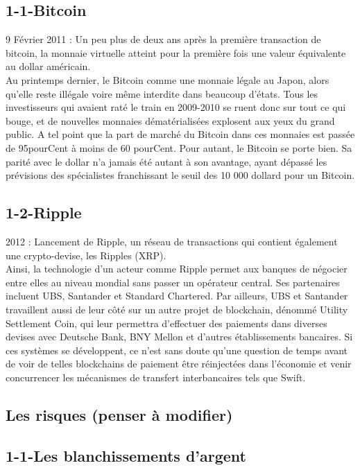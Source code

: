 \documentclass[12pt]{report}
\begin{document}
	    \subsection{1-1-Bitcoin}

9 Février 2011 : Un peu plus de deux ans après la première transaction de bitcoin, la monnaie virtuelle atteint pour la première fois une valeur équivalente au dollar américain.\\

Au printemps dernier, le Bitcoin comme une monnaie légale au Japon, alors qu’elle reste illégale voire même interdite dans beaucoup d’états. Tous les investisseurs qui avaient raté le train en 2009-2010 se ruent donc sur tout ce qui bouge, et de nouvelles monnaies dématérialisées explosent aux yeux du grand public. A tel point que la part de marché du Bitcoin dans ces monnaies est passée de 95pourCent à moins de 60 pourCent. Pour autant, le Bitcoin se porte bien. Sa parité avec le dollar n’a jamais été autant à son avantage, ayant dépassé les prévisions des spécialistes franchissant le seuil des 10 000 dollard pour un Bitcoin.

	    \subsection{1-2-Ripple}

2012 : Lancement de Ripple, un réseau de transactions qui contient également une crypto-devise, les Ripples (XRP).\\

Ainsi, la technologie d'un acteur comme Ripple permet aux banques de négocier entre elles au niveau mondial sans passer un opérateur central. Ses partenaires incluent UBS, Santander et Standard Chartered. Par ailleurs, UBS et Santander travaillent aussi de leur côté sur un autre projet de blockchain, dénommé Utility Settlement Coin, qui leur permettra d’effectuer des paiements dans diverses devises avec Deutsche Bank, BNY Mellon et d’autres établissements bancaires. Si ces systèmes se développent, ce n’est sans doute qu’une question de temps avant de voir de telles blockchains de paiement être réinjectées dans l’économie et venir concurrencer les mécanismes de transfert interbancaires tels que Swift. 

	\subsection{Les risques (penser à modifier)}
	    \subsection{1-1-Les blanchissements d'argent}
\end{document}
